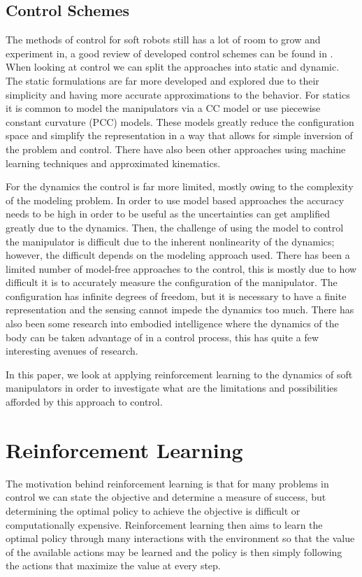 \documentclass[letterpaper, 10 pt, conference]{ieeeconf}  %
\begin{document}
\subsection{Control Schemes}

The methods of control for soft robots still has a lot of room to grow and experiment in, a good review of developed control schemes can be found in \cite{george2018control}. When looking at control we can split the approaches into static and dynamic. The static formulations are far more developed and explored due to their simplicity and having more accurate approximations to the behavior. For statics it is common to model the manipulators via a CC model or use piecewise constant curvature (PCC) models. These models greatly reduce the configuration space and simplify the representation in a way that allows for simple inversion of the problem and control. There have also been other approaches using machine learning techniques and approximated kinematics.

For the dynamics the control is far more limited, mostly owing to the complexity of the modeling problem. In order to use model based approaches the accuracy needs to be high in order to be useful as the uncertainties can get amplified greatly due to the dynamics. Then, the challenge of using the model to control the manipulator is difficult due to the inherent nonlinearity of the dynamics; however, the difficult depends on the modeling approach used. There has been a limited number of model-free approaches to the control, this is mostly due to how difficult it is to accurately measure the configuration of the manipulator. The configuration has infinite degrees of freedom, but it is necessary to have a finite representation and the sensing cannot impede the dynamics too much. There has also been some research into embodied intelligence where the dynamics of the body can be taken advantage of in a control process, this has quite a few interesting avenues of research.

In this paper, we look at applying reinforcement learning to the dynamics of soft manipulators in order to investigate what are the limitations and possibilities afforded by this approach to control.

\section{Reinforcement Learning}

The motivation behind reinforcement learning is that for many problems in control we can state the objective and determine a measure of success, but determining the optimal policy to achieve the objective is difficult or computationally expensive. Reinforcement learning then aims to learn the optimal policy through many interactions with the environment so that the value of the available actions may be learned and the policy is then simply following the actions that maximize the value at every step.
\end{document}
